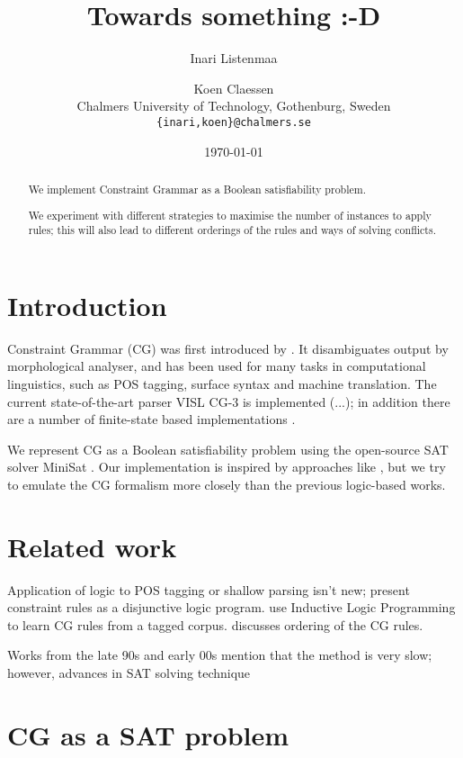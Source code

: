 \documentclass[11pt]{article}
\title{Towards something :-D}
\author{Inari Listenmaa \and Koen Claessen \\
  Chalmers University of Technology, Gothenburg, Sweden \\
  {\tt \{inari,koen\}@chalmers.se} }
\date{\today}
\begin{document}
\maketitle
\begin{abstract}
We implement Constraint Grammar as a Boolean satisfiability problem.

We experiment with different strategies to maximise the number of instances to apply rules;
this will also lead to different orderings of the rules and ways of solving conflicts.


\end{abstract}


\section{Introduction}
Constraint Grammar (CG) was first introduced by \cite{karlsson1995constraint}. 
It disambiguates output by morphological analyser, 
and has been used for many tasks in computational linguistics, such as POS tagging,
surface syntax and machine translation.
The current state-of-the-art parser VISL CG-3 is implemented (...);
in addition there are a number of finite-state based implementations \cite{nemeskey14}.

We represent CG as a Boolean satisfiability problem using the 
open-source SAT solver MiniSat \cite{een04sat}.
Our implementation is inspired by approaches like \cite{lager98,lager_nivre01},
but we try to emulate the CG formalism more closely than the previous logic-based works.


\section{Related work}
\label{sect:related}

Application of logic to POS tagging or shallow parsing isn't new;
\cite{lager98,lager_nivre01} present constraint rules as 
a disjunctive logic program.
\cite{lindberg_eineborg98ilp,asfrent14} use Inductive Logic Programming to learn CG rules from a tagged corpus.
\cite{lager01transformation} discusses ordering of the CG rules.

Works from the late 90s and early 00s mention that the method is very slow;
however, advances in SAT solving technique

\section{CG as a SAT problem}
\label{sect:pdf}
\end{document}
